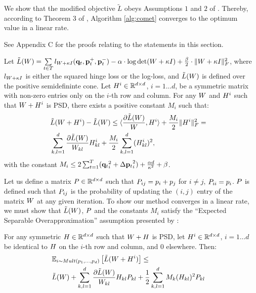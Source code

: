 \documentclass{article}
\begin{document}
We show that the modified objective $\tilde{L}$ obeys Assumptions $1$ and $2$ of \citet{richtarik2013optimal}. Thereby, according to Theorem 3 of \citeauthor{richtarik2013optimal}, Algorithm \ref{alg:comet} converges to the optimum value in a linear rate.

See Appendix C for the proofs relating to the statements in this section.
\begin{lemma}
\label{lem:smooth}
Let 
$\tilde{L}({W})=\sum\limits_{t\in T}{l_{{W} + \kappa I}(\mathbf{q}_t, \mathbf{p}_{t}^{+}, \mathbf{p}_{t}^{-})} -
\alpha \cdot \log \det({W} + \kappa I) + \tfrac{\beta}{2}  \cdot \| {W} + \kappa I \|_{F}^{2}$, 
where $l_{{W} + \kappa I}$ is either the squared hinge loss or the log-loss, and $\tilde{L}({W})$ is defined over the positive semidefininte cone. 
Let ${H}^i \in \mathbb{R}^{d \times d}$, $i=1 \ldots d$, be a symmetric matrix with non-zero entries only on the $i$-th row and column.
For any ${W}$ and ${H}^i$ such that ${W} + {H}^i$ is PSD, there exists a positive constant $M_i$ such that:
\begin{align}
\label{eq:ineq}
&\tilde{L}({W} + {H}^i) - \tilde{L}({W}) \leq  \langle \frac{\partial \tilde{L}({W})}{{W}}, {H}^i \rangle + \frac{M_i}{2} {\|{H}^i\|_F^2} = \\
& \sum_{k,l=1}^d  \frac{\partial \tilde{L}({W})}{{W}_{kl}} {H}_{kl}^i + \frac{M_i}{2} \sum_{k,l=1}^d  ({H}_{kl}^i)^2, \nonumber
\end{align}
with the constant $M_i \leq  2 \sum_{t=1}^T ({{\mathbf{q}}_{{t}}}_i^2 +{\Delta\mathbf{p}_{t}}_i^2) + \frac{\alpha d}{\kappa ^2} + \beta$.
\end{lemma}

Let us define a matrix ${P} \in \mathbb{R}^{d \times d}$ such that ${P}_{ij} = p_i + p_j$ for $i \ne j$, ${P}_{ii} = p_i$. ${P}$ is defined such that ${P}_{ij}$ is the probability of updating the $(i,j)$ entry of the matrix ${W}$ at any given iteration. To show our method converges in a linear rate, we must show that $\tilde{L}({W})$, ${P}$ and the constants $M_i$ satisfy the ``Expected Separable Overapproximation'' assumption presented by \citet{richtarik2013optimal}:

\begin{lemma}\label{lem:ESO}
For any symmetric ${H} \in \mathbb{R}^{d \times d}$ such that ${W} + {H}$ is PSD, let ${H}^i \in \mathbb{R}^{d \times d}$, $i=1 \ldots d$ be identical to ${H}$ on the $i$-th row and column, and $0$ elsewhere. Then:
\begin{align*}
&\mathbb{E}_{i \sim Mult(p_1, \ldots, p_d)} \left[ \tilde{L}({W} + {H}^i) \right] \leq \\
&\tilde{L}({W}) + \sum_{k,l=1}^d  \frac{\partial \tilde{L}({W})}{{W}_{kl}} {H}_{kl} {P}_{kl} + \frac{1}{2} \sum_{k,l=1}^d   M_k ({H}_{kl})^2 {P}_{kl}
\end{align*}
\end{lemma}
\end{document}
